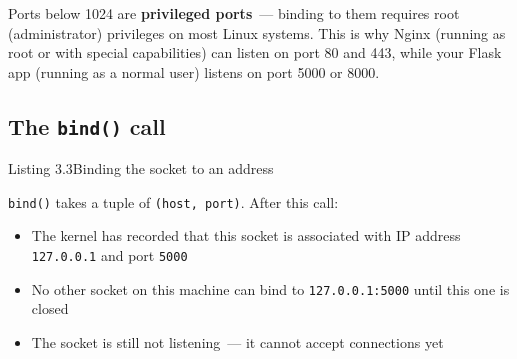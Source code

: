 \noindent{}Ports below 1024 are \textbf{privileged ports}~--- binding to them requires root (administrator) privileges on most Linux systems. This is why Nginx (running as root or with special capabilities) can listen on port 80 and 443, while your Flask app (running as a normal user) listens on port 5000 or 8000.

\subsection*{\texorpdfstring{The \texttt{bind()} call}{The bind() call}}\label{03-network-capability:the-bind-call}

\begin{codeboxcap}[short]{\textcolor{accent}{Listing 3.3}\enspace Binding the socket to an address}

\begin{Shaded}
\begin{Highlighting}[]

\OperatorTok{=}
\NormalTok{)}

\NormalTok{, }\NormalTok{))}

\NormalTok{(}\NormalTok{)}
\end{Highlighting}
\end{Shaded}

\end{codeboxcap}

\noindent{}\texttt{bind()} takes a tuple of \texttt{(host,\ port)}. After this call:

\begin{itemize}
\tightlist
\item
  The kernel has recorded that this socket is associated with IP address \texttt{127.0.0.1} and port \texttt{5000}
\item
  No other socket on this machine can bind to \texttt{127.0.0.1:5000} until this one is closed
\item
  The socket is still not listening~--- it cannot accept connections yet
\end{itemize}

